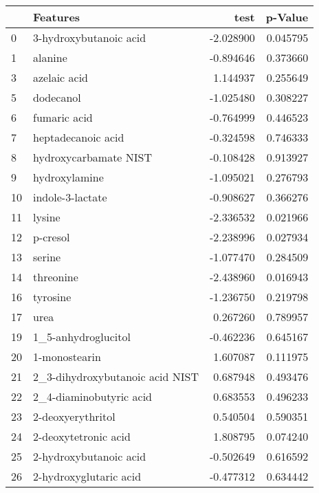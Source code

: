 \begin{tabular}{llrr}
\toprule
{} &                           Features &      test &   p-Value \\
\midrule
0   &             3-hydroxybutanoic acid & -2.028900 &  0.045795 \\
1   &                            alanine & -0.894646 &  0.373660 \\
3   &                       azelaic acid &  1.144937 &  0.255649 \\
5   &                          dodecanol & -1.025480 &  0.308227 \\
6   &                       fumaric acid & -0.764999 &  0.446523 \\
7   &                 heptadecanoic acid & -0.324598 &  0.746333 \\
8   &              hydroxycarbamate NIST & -0.108428 &  0.913927 \\
9   &                      hydroxylamine & -1.095021 &  0.276793 \\
10  &                   indole-3-lactate & -0.908627 &  0.366276 \\
11  &                             lysine & -2.336532 &  0.021966 \\
12  &                           p-cresol & -2.238996 &  0.027934 \\
13  &                             serine & -1.077470 &  0.284509 \\
14  &                          threonine & -2.438960 &  0.016943 \\
16  &                           tyrosine & -1.236750 &  0.219798 \\
17  &                               urea &  0.267260 &  0.789957 \\
19  &                1\_5-anhydroglucitol & -0.462236 &  0.645167 \\
20  &                      1-monostearin &  1.607087 &  0.111975 \\
21  &    2\_3-dihydroxybutanoic acid NIST &  0.687948 &  0.493476 \\
22  &            2\_4-diaminobutyric acid &  0.683553 &  0.496233 \\
23  &                  2-deoxyerythritol &  0.540504 &  0.590351 \\
24  &               2-deoxytetronic acid &  1.808795 &  0.074240 \\
25  &             2-hydroxybutanoic acid & -0.502649 &  0.616592 \\
26  &             2-hydroxyglutaric acid & -0.477312 &  0.634442 \\

\end{tabular}

